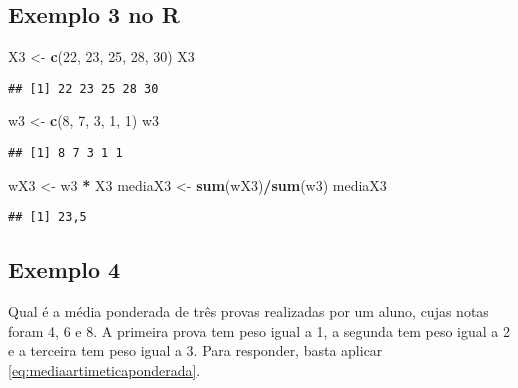 \documentclass[
]{book}
\newenvironment{Shaded}{\begin{snugshade}}{\end{snugshade}}
\newcommand{\DecValTok}[1]{\textcolor[rgb]{0.00,0.00,0.81}{#1}}
\newcommand{\KeywordTok}[1]{\textcolor[rgb]{0.13,0.29,0.53}{\textbf{#1}}}
\newcommand{\NormalTok}[1]{#1}
\newcommand{\OperatorTok}[1]{\textcolor[rgb]{0.81,0.36,0.00}{\textbf{#1}}}
\newcommand{\StringTok}[1]{\textcolor[rgb]{0.31,0.60,0.02}{#1}}
\begin{document}
\hypertarget{exemplo-3-no-r}{%
\subsection{Exemplo 3 no R}\label{exemplo-3-no-r}}

\begin{Shaded}
\begin{Highlighting}[]
\NormalTok{X3 <-}\StringTok{ }\KeywordTok{c}\NormalTok{(}\DecValTok{22}\NormalTok{, }\DecValTok{23}\NormalTok{, }\DecValTok{25}\NormalTok{, }\DecValTok{28}\NormalTok{, }\DecValTok{30}\NormalTok{)}
\NormalTok{X3}
\end{Highlighting}
\end{Shaded}

\begin{verbatim}
## [1] 22 23 25 28 30
\end{verbatim}

\begin{Shaded}
\begin{Highlighting}[]
\NormalTok{w3 <-}\StringTok{ }\KeywordTok{c}\NormalTok{(}\DecValTok{8}\NormalTok{, }\DecValTok{7}\NormalTok{, }\DecValTok{3}\NormalTok{, }\DecValTok{1}\NormalTok{, }\DecValTok{1}\NormalTok{)}
\NormalTok{w3}
\end{Highlighting}
\end{Shaded}

\begin{verbatim}
## [1] 8 7 3 1 1
\end{verbatim}

\begin{Shaded}
\begin{Highlighting}[]
\NormalTok{wX3 <-}\StringTok{ }\NormalTok{w3 }\OperatorTok{*}\StringTok{ }\NormalTok{X3}
\NormalTok{mediaX3 <-}\StringTok{ }\KeywordTok{sum}\NormalTok{(wX3)}\OperatorTok{/}\KeywordTok{sum}\NormalTok{(w3)}
\NormalTok{mediaX3}
\end{Highlighting}
\end{Shaded}

\begin{verbatim}
## [1] 23,5
\end{verbatim}

\hypertarget{exemplo-4}{%
\subsection{Exemplo 4}\label{exemplo-4}}

Qual é a média ponderada de três provas realizadas por um aluno, cujas notas foram 4, 6 e 8. A primeira prova tem peso igual a 1, a segunda tem peso igual a 2 e a terceira tem peso igual a 3. Para responder, basta aplicar \eqref{eq:mediaartimeticaponderada}.
\end{document}
